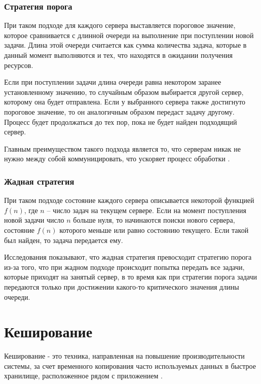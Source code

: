 \subsubsection{Стратегия порога}

При таком подходе для каждого сервера выставляется пороговое значение, которое сравнивается с длинной очереди на выполнение при поступлении новой задачи. Длина этой очереди считается как сумма количества задача, которые в данный момент выполняются и тех, что находятся в ожидании получения ресурсов.

Если при поступлении задачи длина очереди равна некотором заранее установленному значению, то случайным образом выбирается другой сервер, которому она будет отправлена. Если у выбранного сервера также достигнуто пороговое значение, то он аналогичным образом передаст задачу другому. Процесс будет продолжаться до тех пор, пока не будет найден подходящий сервер.

Главным преимуществом такого подхода является то, что серверам никак не нужно между собой коммуницировать, что ускоряет процесс обработки \cite{cyberlenin2}.

\subsubsection{Жадная стратегия}

При таком подходе состояние каждого сервера описывается некоторой функцией $f(n)$, где $n$ -- число задач на текущем сервере. Если на момент поступления новой задачи число $n$ больше нуля, то начинаются поиски нового сервера, состояние $f(n)$ которого меньше или равно состоянию текущего. Если такой был найден, то задача передается ему. 

Исследования \cite{greedyalg} показывают, что жадная стратегия превосходит стратегию порога из-за того, что при жадном подходе происходит попытка передать все задачи, которые приходят на занятый сервер, в то время как при стратегии порога задачи передаются только при достижении какого-то критического значения длины очереди.

\section{Кеширование}

Кеширование - это техника, направленная на повышение производительности системы, за счет временного копирования часто используемых данных в быстрое хранилище, расположенное рядом с приложением \cite{caching}.

